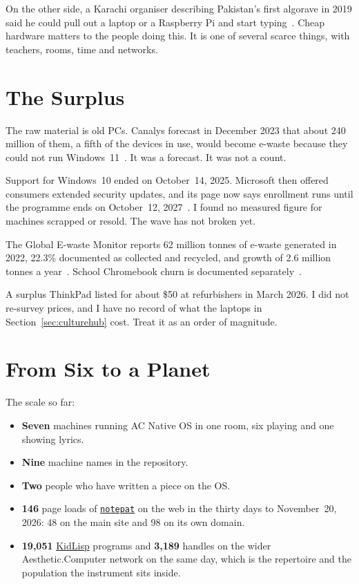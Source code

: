 \documentclass[10pt,letterpaper,twocolumn]{article}
\newcommand{\acdot}{{\color{acpink}.}}
\newcommand{\ac}{Aesthetic{\acdot}Computer}
\newcommand{\acos}{AC Native OS}
\newcommand{\np}{\href{https://notepat.com}{\texttt{notepat}}}
\begin{document}
On the other side, a Karachi organiser describing Pakistan's first algorave in 2019 said he could pull out a laptop or a Raspberry Pi and start typing~\citep{wildcity2021algorave}. Cheap hardware matters to the people doing this. It is one of several scarce things, with teachers, rooms, time and networks.


\section{The Surplus}
\label{sec:surplus}

The raw material is old PCs. Canalys forecast in December 2023 that about 240 million of them, a fifth of the devices in use, would become e-waste because they could not run Windows~11~\citep{canalys2023windows10}. It was a forecast. It was not a count.

Support for Windows~10 ended on October~14, 2025. Microsoft then offered consumers extended security updates, and its page now says enrollment runs until the programme ends on October~12, 2027~\citep{microsoft2026esu}. I found no measured figure for machines scrapped or resold. The wave has not broken yet.

The Global E-waste Monitor reports 62 million tonnes of e-waste generated in 2022, 22.3\% documented as collected and recycled, and growth of 2.6 million tonnes a year~\citep{forti2024ewaste}. School Chromebook churn is documented separately~\citep{pirg2023chromebook}.

A surplus ThinkPad listed for about \$50 at refurbishers in March 2026. I did not re-survey prices, and I have no record of what the laptops in Section~\ref{sec:culturehub} cost. Treat it as an order of magnitude.


\section{From Six to a Planet}
\label{sec:scaling}

The scale so far:

\begin{itemize}
  \item \textbf{Seven} machines running \acos{} in one room, six playing and one showing lyrics.
  \item \textbf{Nine} machine names in the repository.
  \item \textbf{Two} people who have written a piece on the OS.
  \item \textbf{146} page loads of \np{} on the web in the thirty days to November~20, 2026: 48 on the main site and 98 on its own domain.
  \item \textbf{19,051} \href{https://kidlisp.com}{KidLisp} programs and \textbf{3,189} handles on the wider \ac{} network on the same day, which is the repertoire and the population the instrument sits inside.
\end{itemize}
\end{document}
